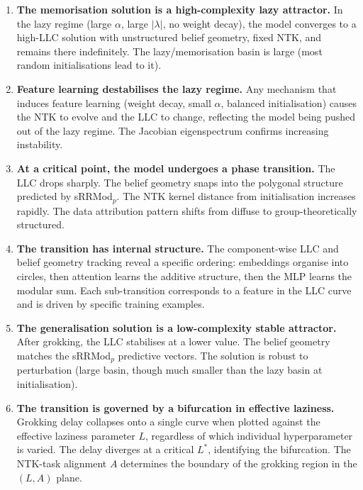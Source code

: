 \documentclass[11pt,a4paper]{article}
\begin{document}
\begin{enumerate}[label=\textbf{\arabic*.}]
    \item \textbf{The memorisation solution is a high-complexity lazy attractor.} In the lazy regime (large $\alpha$, large $|\lambda|$, no weight decay), the model converges to a high-LLC solution with unstructured belief geometry, fixed NTK, and remains there indefinitely. The lazy/memorisation basin is large (most random initialisations lead to it).

    \item \textbf{Feature learning destabilises the lazy regime.} Any mechanism that induces feature learning (weight decay, small $\alpha$, balanced initialisation) causes the NTK to evolve and the LLC to change, reflecting the model being pushed out of the lazy regime. The Jacobian eigenspectrum confirms increasing instability.

    \item \textbf{At a critical point, the model undergoes a phase transition.} The LLC drops sharply. The belief geometry snaps into the polygonal structure predicted by sRRMod$_p$. The NTK kernel distance from initialisation increases rapidly. The data attribution pattern shifts from diffuse to group-theoretically structured.

    \item \textbf{The transition has internal structure.} The component-wise LLC and belief geometry tracking reveal a specific ordering: embeddings organise into circles, then attention learns the additive structure, then the MLP learns the modular sum. Each sub-transition corresponds to a feature in the LLC curve and is driven by specific training examples.

    \item \textbf{The generalisation solution is a low-complexity stable attractor.} After grokking, the LLC stabilises at a lower value. The belief geometry matches the sRRMod$_p$ predictive vectors. The solution is robust to perturbation (large basin, though much smaller than the lazy basin at initialisation).

    \item \textbf{The transition is governed by a bifurcation in effective laziness.} Grokking delay collapses onto a single curve when plotted against the effective laziness parameter $L$, regardless of which individual hyperparameter is varied. The delay diverges at a critical $L^*$, identifying the bifurcation. The NTK-task alignment $A$ determines the boundary of the grokking region in the $(L, A)$ plane.


\end{enumerate}
\end{document}

